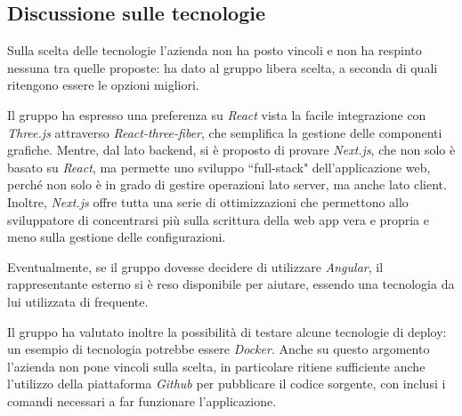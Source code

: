 \subsection{Discussione sulle tecnologie}
Sulla scelta delle tecnologie l'azienda non ha posto vincoli e non ha respinto nessuna tra quelle proposte: ha dato al gruppo libera scelta, a seconda di quali ritengono essere le opzioni migliori.
\par Il gruppo ha espresso una preferenza su \textit{React} vista la facile integrazione con \textit{Three.js} attraverso \textit{React-three-fiber}, che semplifica la gestione delle componenti grafiche. Mentre, dal lato backend, si è proposto di provare \textit{Next.js}, che non solo è basato su \textit{React}, ma permette uno sviluppo ``full-stack" dell'applicazione web, perché non solo è in grado di gestire operazioni lato server, ma anche lato client. Inoltre, \textit{Next.js} offre tutta una serie di ottimizzazioni che permettono allo sviluppatore di concentrarsi più sulla scrittura della web app vera e propria e meno sulla gestione delle configurazioni.
\par Eventualmente, se il gruppo dovesse decidere di utilizzare \textit{Angular}, il rappresentante esterno si è reso disponibile per aiutare, essendo una tecnologia da lui utilizzata di frequente.
\par Il gruppo ha valutato inoltre la possibilità di testare alcune tecnologie di deploy: un esempio di tecnologia potrebbe essere \textit{Docker}. Anche su questo argomento l'azienda non pone vincoli sulla scelta, in particolare ritiene sufficiente anche l'utilizzo della piattaforma \textit{Github} per pubblicare il codice sorgente, con inclusi i comandi necessari a far funzionare l'applicazione.